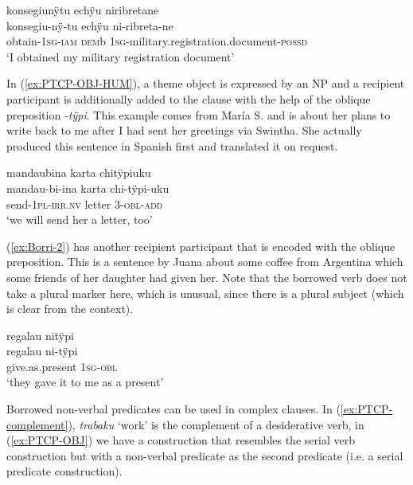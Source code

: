\ea\label{ex:Borri-4}
\begingl
\glpreamble konsegiunÿtu echÿu niribretane\\
\gla konsegiu-nÿ-tu echÿu ni-ribreta-ne\\
\glb obtain-1\textsc{sg}-\textsc{iam} \textsc{dem}b 1\textsc{sg}-military.registration.document-\textsc{possd}\\
\glft ‘I obtained my military registration document’
\endgl
\trailingcitation{[mxx-p181027l-1.114]}
\xe


In (\ref{ex:PTCP-OBJ-HUM}), a theme object is expressed by an NP and a recipient participant is additionally added to the clause with the help of the oblique preposition \textit{-tÿpi}. This example comes from María S. and is about her plans to write back to me after I had sent her greetings via Swintha. She actually produced this sentence in Spanish first and translated it on request.

\ea\label{ex:PTCP-OBJ-HUM}
\begingl 
\glpreamble mandaubina karta chitÿpiuku\\
\gla mandau-bi-ina karta chi-tÿpi-uku\\ 
\glb send-1\textsc{pl}-\textsc{irr.nv} letter 3-\textsc{obl}-\textsc{add}\\ 
\glft ‘we will send her a letter, too’\\ 
\endgl
\trailingcitation{[rxx-e121128s-1.115]}
\xe


(\ref{ex:Borri-2}) has another recipient participant that is encoded with the oblique preposition. This is a sentence by Juana about some coffee from Argentina which some friends of her daughter had given her. Note that the borrowed verb does not take a plural marker here, which is unusual, since there is a plural subject (which is clear from the context).

\ea\label{ex:Borri-2}
\begingl
\glpreamble regalau nitÿpi\\
\gla regalau ni-tÿpi\\
\glb give.as.present 1\textsc{sg}-\textsc{obl}\\
\glft ‘they gave it to me as a present’
\endgl
\trailingcitation{[jxx-e120430l-4.29]}
\xe
{}

Borrowed non-verbal predicates can be used in complex clauses. In (\ref{ex:PTCP-complement}), \textit{trabaku} ‘work’ is the complement of a desiderative verb, in (\ref{ex:PTCP-OBJ}) we have a construction that resembles the serial verb construction but with a non-verbal predicate as the second predicate (i.e. a serial predicate construction).

